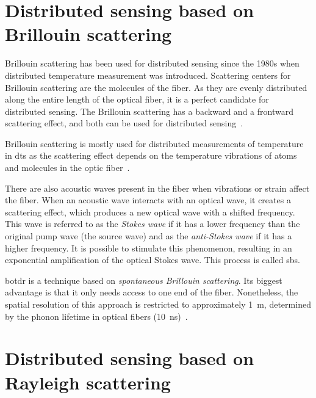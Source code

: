 \section{Distributed sensing based on Brillouin scattering}

Brillouin scattering has been used for distributed sensing since the 1980s when distributed temperature measurement was introduced. Scattering centers for Brillouin scattering are the molecules of the fiber. As they are evenly distributed along the entire length of the optical fiber, it is a perfect candidate for distributed sensing. The Brillouin scattering has a backward and a frontward scattering effect, and both can be used for distributed sensing~\cite{bhundred}.

Brillouin scattering is mostly used for distributed measurements of temperature in \ac{dts} as the scattering effect depends on the temperature vibrations of atoms and molecules in the optic fiber~\cite{distributedrayleigh}.

There are also acoustic waves present in the fiber when vibrations or strain affect the fiber. When an acoustic wave interacts with an optical wave, it creates a scattering effect, which produces a new optical wave with a shifted frequency. This wave is referred to as the \textit{Stokes wave} if it has a lower frequency than the original pump wave (the source wave) and as the \textit{anti-Stokes wave} if it has a higher frequency. It is possible to stimulate this phenomenon, resulting in an exponential amplification of the optical Stokes wave. This process is called \ac{sbs}.

\ac{botdr} is a technique based on \textit{spontaneous Brillouin scattering}. Its biggest advantage is that it only needs access to one end of the fiber. Nonetheless, the spatial resolution of this approach is restricted to approximately \qty{1}{\meter}, determined by the phonon lifetime in optical fibers (\qty{10}{ns})~\cite{bhundred}.





\section{Distributed sensing based on Rayleigh scattering}

